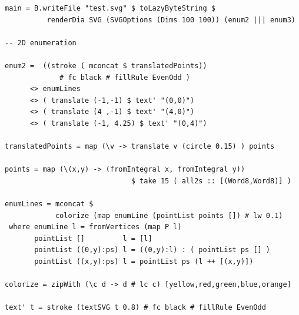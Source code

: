 \documentclass{tmr}
\begin{document}
\begin{verbatim}
main = B.writeFile "test.svg" $ toLazyByteString $
          renderDia SVG (SVGOptions (Dims 100 100)) (enum2 ||| enum3)

-- 2D enumeration

enum2 =  ((stroke ( mconcat $ translatedPoints)) 
             # fc black # fillRule EvenOdd )
      <> enumLines
      <> ( translate (-1,-1) $ text' "(0,0)")
      <> ( translate (4 ,-1) $ text' "(4,0)")
      <> ( translate (-1, 4.25) $ text' "(0,4)")

translatedPoints = map (\v -> translate v (circle 0.15) ) points

points = map (\(x,y) -> (fromIntegral x, fromIntegral y))
                              $ take 15 ( all2s :: [(Word8,Word8)] )

enumLines = mconcat $ 
            colorize (map enumLine (pointList points []) # lw 0.1)
 where enumLine l = fromVertices (map P l)
       pointList []         l = [l]
       pointList ((0,y):ps) l = ((0,y):l) : ( pointList ps [] )
       pointList ((x,y):ps) l = pointList ps (l ++ [(x,y)])

colorize = zipWith (\c d -> d # lc c) [yellow,red,green,blue,orange]

text' t = stroke (textSVG t 0.8) # fc black # fillRule EvenOdd
\end{verbatim}


\end{document}

